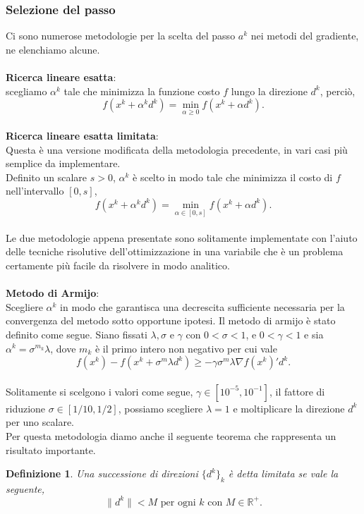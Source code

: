 \documentclass[a4paper, 12pt]{article}
\newtheorem{definition}{Definizione}
\begin{document}
\subsubsection{Selezione del passo}
Ci sono numerose metodologie per la scelta del passo $a^k$ nei metodi del gradiente, ne elenchiamo alcune.\\\\
\textbf{Ricerca lineare esatta}:\\
scegliamo $\alpha^k$ tale che minimizza la funzione costo $f$ lungo la direzione $d^k$, perciò,\\
\[f(x^k + \alpha^k d^k) = \min_{\alpha \geq 0} f(x^k + \alpha d^k).\]\\
\textbf{Ricerca lineare esatta limitata}:\\
Questa è una versione modificata della metodologia precedente, in vari casi più semplice da implementare.\\
Definito un scalare $s > 0$, $\alpha^k$ è scelto in modo tale che minimizza il costo di $f$ nell'intervallo $[0, s]$,\\
\[f(x^k + \alpha^k d^k) = \min_{\alpha \in [0, s]} f(x^k + \alpha d^k).\]\\
Le due metodologie appena presentate sono solitamente implementate con l'aiuto delle tecniche risolutive dell'ottimizzazione in una variabile che è un problema certamente più facile da risolvere in modo analitico.\\\\
\textbf{Metodo di Armijo}:\\
Scegliere $\alpha^k$ in modo che garantisca una decrescita sufficiente necessaria per la convergenza del metodo sotto opportune ipotesi. Il metodo di armijo è stato definito come segue. Siano fissati $\lambda, \sigma$ e $\gamma$ con $0 < \sigma < 1$, e $0 < \gamma < 1$ e sia $\alpha^k = \sigma^{m_k} \lambda$, dove $m_k$ è il primo intero non negativo per cui vale\\
\[f(x^k) - f(x^k + \sigma^m \lambda d^k) \geq -\gamma \sigma^m \lambda \nabla f(x^k)'d^k.\]\\
Solitamente si scelgono i valori come segue, $\gamma \in [10^{-5}, 10^{-1}]$, il fattore di riduzione $\sigma \in [1/10, 1/2]$, possiamo scegliere $\lambda = 1$ e moltiplicare la direzione $d^k$ per uno scalare.\\
Per questa metodologia diamo anche il seguente teorema che rappresenta un risultato importante.
\begin{definition}
Una successione di direzioni $\{d^k\}_k$ è detta limitata se vale la seguente,\\ \[\parallel d^k \parallel < M \mbox{ per ogni } k \mbox{ con } M \in \mathbb{R}^+.\]
\end{definition}
\end{document}
